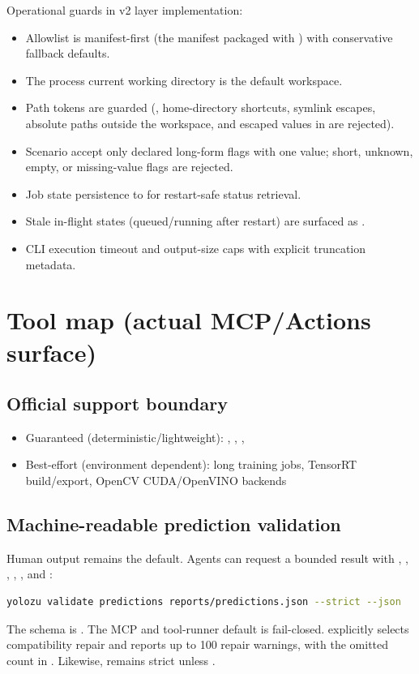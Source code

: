 Operational guards in v2 layer implementation:
\begin{itemize}
  \item Allowlist is manifest-first (the manifest packaged with \yolozu{}) with conservative fallback defaults.
  \item The process current working directory is the default workspace.
  \item Path tokens are guarded (, home-directory shortcuts, symlink escapes, absolute paths outside the workspace, and escaped values in  are rejected).
  \item Scenario  accept only declared long-form flags with one value; short, unknown, empty, or missing-value flags are rejected.
  \item Job state persistence to  for restart-safe status retrieval.
  \item Stale in-flight states (queued/running after restart) are surfaced as .
  \item CLI execution timeout and output-size caps with explicit truncation metadata.
\end{itemize}

\section{Tool map (actual MCP/Actions surface)}

\subsection{Official support boundary}
\begin{itemize}
  \item Guaranteed (deterministic/lightweight): , , , 
  \item Best-effort (environment dependent): long training jobs, TensorRT build/export, OpenCV CUDA/OpenVINO backends
\end{itemize}

\subsection{Machine-readable prediction validation}

Human output remains the default. Agents can request a bounded result with
, , , ,
, and :
\begin{lstlisting}[language=bash]
yolozu validate predictions reports/predictions.json --strict --json
\end{lstlisting}
The schema is
.
The MCP and tool-runner default  is fail-closed.
 explicitly selects compatibility repair and reports up to
100 repair warnings, with the omitted count in
. Likewise,  remains strict
unless .


